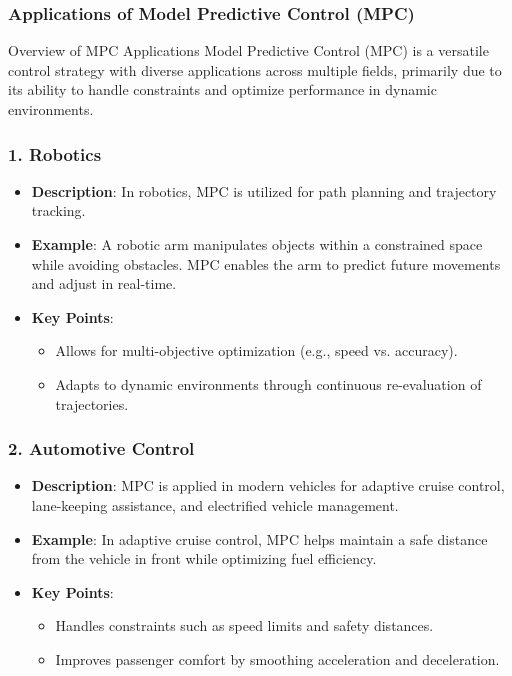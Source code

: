 \documentclass[aspectratio=169]{beamer}
\begin{document}
\begin{frame}[fragile]
    \frametitle{Applications of Model Predictive Control (MPC)}
    \begin{block}{Overview of MPC Applications}
        Model Predictive Control (MPC) is a versatile control strategy with diverse applications across multiple fields, primarily due to its ability to handle constraints and optimize performance in dynamic environments.
    \end{block}
\end{frame}

\begin{frame}[fragile]
    \frametitle{1. Robotics}
    \begin{itemize}
        \item \textbf{Description}: In robotics, MPC is utilized for path planning and trajectory tracking.
        \item \textbf{Example}: A robotic arm manipulates objects within a constrained space while avoiding obstacles. MPC enables the arm to predict future movements and adjust in real-time.
        \item \textbf{Key Points}:
        \begin{itemize}
            \item Allows for multi-objective optimization (e.g., speed vs. accuracy).
            \item Adapts to dynamic environments through continuous re-evaluation of trajectories.
        \end{itemize}
    \end{itemize}
\end{frame}

\begin{frame}[fragile]
    \frametitle{2. Automotive Control}
    \begin{itemize}
        \item \textbf{Description}: MPC is applied in modern vehicles for adaptive cruise control, lane-keeping assistance, and electrified vehicle management.
        \item \textbf{Example}: In adaptive cruise control, MPC helps maintain a safe distance from the vehicle in front while optimizing fuel efficiency.
        \item \textbf{Key Points}:
        \begin{itemize}
            \item Handles constraints such as speed limits and safety distances.
            \item Improves passenger comfort by smoothing acceleration and deceleration.
        \end{itemize}
    \end{itemize}
\end{frame}
\end{document}
